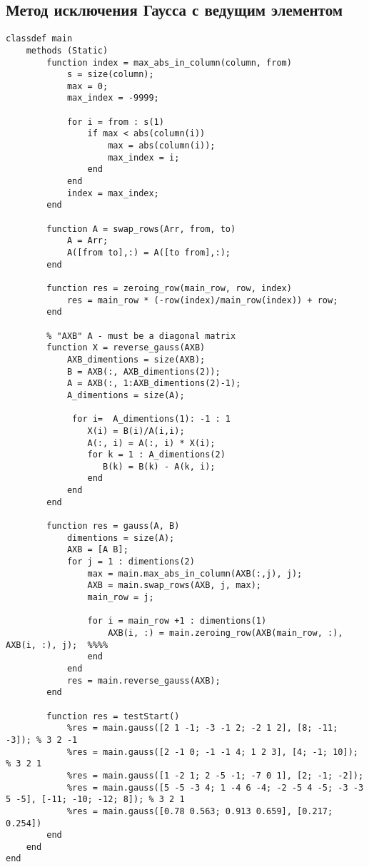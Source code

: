 \documentclass{article}
\begin{document}
\subsection{Метод исключения Гаусса с ведущим элементом}
\begin{lstlisting}
classdef main
    methods (Static)
        function index = max_abs_in_column(column, from)
            s = size(column);
            max = 0;
            max_index = -9999;

            for i = from : s(1)
                if max < abs(column(i))
                    max = abs(column(i));
                    max_index = i;
                end
            end
            index = max_index;
        end

        function A = swap_rows(Arr, from, to)
            A = Arr;
            A([from to],:) = A([to from],:);    
        end

        function res = zeroing_row(main_row, row, index)
            res = main_row * (-row(index)/main_row(index)) + row;
        end

        % "AXB" A - must be a diagonal matrix
        function X = reverse_gauss(AXB)
            AXB_dimentions = size(AXB);
            B = AXB(:, AXB_dimentions(2));
            A = AXB(:, 1:AXB_dimentions(2)-1);
            A_dimentions = size(A);

             for i=  A_dimentions(1): -1 : 1
                X(i) = B(i)/A(i,i);
                A(:, i) = A(:, i) * X(i);
                for k = 1 : A_dimentions(2)
                   B(k) = B(k) - A(k, i);
                end
            end
        end

        function res = gauss(A, B)
            dimentions = size(A);
            AXB = [A B];
            for j = 1 : dimentions(2)
                max = main.max_abs_in_column(AXB(:,j), j);
                AXB = main.swap_rows(AXB, j, max); 
                main_row = j;

                for i = main_row +1 : dimentions(1)
                    AXB(i, :) = main.zeroing_row(AXB(main_row, :), AXB(i, :), j);  %%%%
                end
            end
            res = main.reverse_gauss(AXB);
        end

        function res = testStart()
            %res = main.gauss([2 1 -1; -3 -1 2; -2 1 2], [8; -11; -3]); % 3 2 -1
            %res = main.gauss([2 -1 0; -1 -1 4; 1 2 3], [4; -1; 10]); % 3 2 1
            %res = main.gauss([1 -2 1; 2 -5 -1; -7 0 1], [2; -1; -2]);
            %res = main.gauss([5 -5 -3 4; 1 -4 6 -4; -2 -5 4 -5; -3 -3 5 -5], [-11; -10; -12; 8]); % 3 2 1 
            %res = main.gauss([0.78 0.563; 0.913 0.659], [0.217; 0.254])
        end
    end
end

\end{lstlisting}
\end{document}
